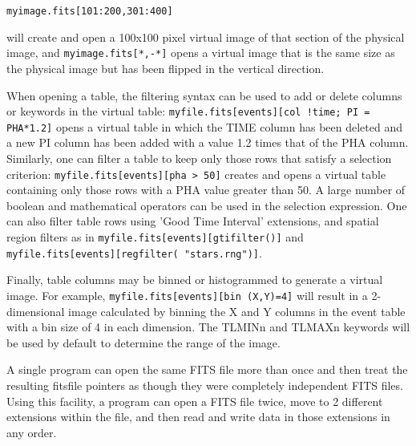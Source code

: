 \documentclass[11pt]{book}
\begin{document}
\begin{description}
\begin{verbatim}
myimage.fits[101:200,301:400]
\end{verbatim}
will create and open a 100x100 pixel virtual image of that section of
the physical image, and \verb+myimage.fits[*,-*]+ opens a virtual image
that is the same size as the physical image but has been flipped in
the vertical direction.

When opening a table, the filtering syntax can be used to add or delete
columns or keywords in the virtual table:
\verb-myfile.fits[events][col !time; PI = PHA*1.2]- opens a virtual table in which the TIME column
has been deleted and a new PI column has been added with a value 1.2
times that of the PHA column. Similarly, one can filter a table to keep
only those rows that satisfy a selection criterion:
\verb-myfile.fits[events][pha > 50]- creates and opens a virtual table
containing only those rows with a PHA value greater than 50. A large
number of boolean and mathematical operators can be used in the
selection expression. One can also filter table rows using 'Good Time
Interval' extensions, and spatial region filters as in
\verb-myfile.fits[events][gtifilter()]- and
\verb-myfile.fits[events][regfilter( "stars.rng")]-.

Finally, table columns may be binned or histogrammed to generate a
virtual image. For example, \verb-myfile.fits[events][bin (X,Y)=4]- will
result in a 2-dimensional image calculated by binning the X and Y
columns in the event table with a bin size of 4 in each dimension. The
TLMINn and TLMAXn keywords will be used by default to determine the
range of the image.

A single program can open the same FITS file more than once and then
treat the resulting fitsfile pointers as though they were completely
independent FITS files. Using this facility, a program can open a FITS
file twice, move to 2 different extensions within the file, and then
 read and write data in those extensions in any order.
\end{description}
\end{document}
